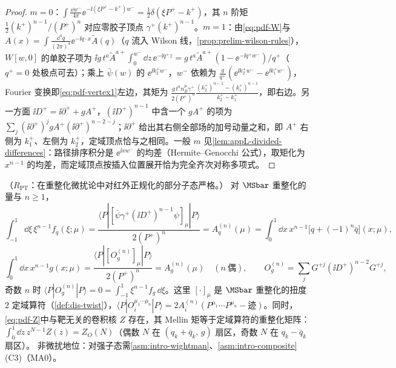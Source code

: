 \begin{proof}
$m=0$：$\int\frac{\dd w^-}{4\pi}\ee^{-\ii(\xi P^+-k^+)w^-}=\frac12\delta(\xi P^+-k^+)$，其 $n$ 阶矩 $\frac12(k^+)^{n-1}/(P^+)^n$ 对应零胶子顶点 $\gamma^+(k^+)^{n-1}$。$m=1$：由\cref{eq:pdf-W}与 $A(x)=\int\frac{\dd^4q}{(2\pi)^4}\ee^{-\ii q\cdot x}\tilde A(q)$（$q$ 流入 Wilson 线，\cref{prop:prelim-wilson-rules}），$W[w,0]$ 的单胶子项为 $\ii g\,t^a\tilde A^{a+}\int_0^{w^-}\dd z\,\ee^{-\ii q^+z}=g\,t^a\tilde A^{a+}(1-\ee^{-\ii q^+w^-})/q^+$（$q^+=0$ 处极点可去）；乘上 $\bar\psi(w)$ 的 $\ee^{\ii k_2^+w^-}$，$w^-$ 依赖为 $\frac{g}{q^+}(\ee^{\ii k_2^+w^-}-\ee^{\ii k_1^+w^-})$，Fourier 变换即\cref{eq:pdf-vertex1}左边，其矩为 $\frac{g\,t^an_B^\mu\gamma^+}{2(P^+)^n}\frac{(k_2^+)^{n-1}-(k_1^+)^{n-1}}{k_2^+-k_1^+}$，即右边。另一方面 $\ii D^+=\ii\partial^++gA^+$，$(\ii D^+)^{n-1}$ 中含一个 $gA^+$ 的项为 $\sum_j(\ii\partial^+)^jgA^+(\ii\partial^+)^{n-2-j}$；$\ii\partial^+$ 给出其右侧全部场的加号动量之和，即 $A^+$ 右侧为 $k_1^+$、左侧为 $k_2^+$，定域顶点恰与之相同。一般 $m$ 见\cref{lem:appL-divided-differences}：路径排序积分是 $\ee^{\ii xw^-}$ 的均差（Hermite--Genocchi 公式），取矩化为 $x^{n-1}$ 的均差，而定域顶点按插入位置展开恰为完全齐次对称多项式。
\end{proof}

\begin{theorem}[PDF 的矩 = 扭度 2 定域算符矩阵元 \tagR]\label{thm:pdf-moments-local}
（$R_{\mathrm{PT}}$：在重整化微扰论中对红外正规化的部分子态严格。）
对 $\MSbar$ 重整化的量与 $n\ge1$，
\begin{equation}\label{eq:pdf-moments}
\int_{-1}^1\dd\xi\,\xi^{n-1}f_q(\xi;\mu)=\frac{\langle P|[\bar\psi\gamma^+(\ii D^+)^{n-1}\psi]_\mu|P\rangle}{2(P^+)^n}=A^{(n)}_q(\mu)=\int_0^1\dd x\,x^{n-1}\big[q+(-1)^n\bar q\big](x;\mu),
\end{equation}
\begin{equation}\label{eq:pdf-moments-g}
\int_0^1\dd x\,x^{n-1}g(x;\mu)=\frac{\langle P|[O_g^{(n)}]_\mu|P\rangle}{2(P^+)^n}=A^{(n)}_g(\mu)\quad(n\ \text{偶}),\qquad O_g^{(n)}=\sum_jG^{+j}(\ii D^+)^{n-2}G^{+j},
\end{equation}
奇数 $n$ 时 $\langle P|O_g^{(n)}|P\rangle=0=\int_{-1}^1\xi^{n-1}f_g\,\dd\xi$。这里 $[\cdot]_\mu$ 是 $\MSbar$ 重整化的扭度 2 定域算符（\cref{def:dis-twist}），$\langle P|O_i^{\mu_1\cdots\mu_n}|P\rangle=2A^{(n)}_i(P^{\mu_1}\cdots P^{\mu_n}-\text{迹})$。同时，\cref{eq:pdf-Z}中与靶无关的卷积核 $Z$ 存在，其 Mellin 矩等于定域算符的重整化矩阵：$\int_0^1\dd z\,z^{N-1}Z(z)=Z_O(N)$（偶数 $N$ 在 $(q_k+\bar q_k,\,g)$ 扇区，奇数 $N$ 在 $q_k-\bar q_k$ 扇区）。
非微扰地位：对强子态需\cref{asm:intro-wightman}、\cref{asm:intro-composite}(C3)（MA0）。
\end{theorem}

